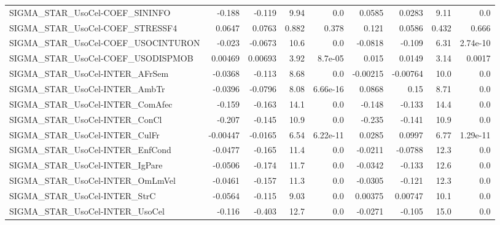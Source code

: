 \begin{tabular}{lrrrrrrrr}
SIGMA\_STAR\_UsoCel-COEF\_SININFO         &      -0.188 &       -0.119 &    9.94 &      0.0 &     0.0585 &      0.0283 &         9.11 &           0.0 \\
SIGMA\_STAR\_UsoCel-COEF\_STRESSF4        &      0.0647 &       0.0763 &   0.882 &    0.378 &      0.121 &      0.0586 &        0.432 &         0.666 \\
SIGMA\_STAR\_UsoCel-COEF\_USOCINTURON     &      -0.023 &      -0.0673 &    10.6 &      0.0 &    -0.0818 &      -0.109 &         6.31 &      2.74e-10 \\
SIGMA\_STAR\_UsoCel-COEF\_USODISPMOB      &     0.00469 &      0.00693 &    3.92 &  8.7e-05 &      0.015 &      0.0149 &         3.14 &        0.0017 \\
SIGMA\_STAR\_UsoCel-INTER\_AFrSem         &     -0.0368 &       -0.113 &    8.68 &      0.0 &   -0.00215 &    -0.00764 &         10.0 &           0.0 \\
SIGMA\_STAR\_UsoCel-INTER\_AmbTr          &     -0.0396 &      -0.0796 &    8.08 & 6.66e-16 &     0.0868 &        0.15 &         8.71 &           0.0 \\
SIGMA\_STAR\_UsoCel-INTER\_ComAfec        &      -0.159 &       -0.163 &    14.1 &      0.0 &     -0.148 &      -0.133 &         14.4 &           0.0 \\
SIGMA\_STAR\_UsoCel-INTER\_ConCl          &      -0.207 &       -0.145 &    10.9 &      0.0 &     -0.235 &      -0.141 &         10.9 &           0.0 \\
SIGMA\_STAR\_UsoCel-INTER\_CulFr          &    -0.00447 &      -0.0165 &    6.54 & 6.22e-11 &     0.0285 &      0.0997 &         6.77 &      1.29e-11 \\
SIGMA\_STAR\_UsoCel-INTER\_EnfCond        &     -0.0477 &       -0.165 &    11.4 &      0.0 &    -0.0211 &     -0.0788 &         12.3 &           0.0 \\
SIGMA\_STAR\_UsoCel-INTER\_IgPare         &     -0.0506 &       -0.174 &    11.7 &      0.0 &    -0.0342 &      -0.133 &         12.6 &           0.0 \\
SIGMA\_STAR\_UsoCel-INTER\_OmLmVel        &     -0.0461 &       -0.157 &    11.3 &      0.0 &    -0.0305 &      -0.121 &         12.3 &           0.0 \\
SIGMA\_STAR\_UsoCel-INTER\_StrC           &     -0.0564 &       -0.115 &    9.03 &      0.0 &    0.00375 &     0.00747 &         10.1 &           0.0 \\
SIGMA\_STAR\_UsoCel-INTER\_UsoCel         &      -0.116 &       -0.403 &    12.7 &      0.0 &    -0.0271 &      -0.105 &         15.0 &           0.0 \\

\end{tabular}
